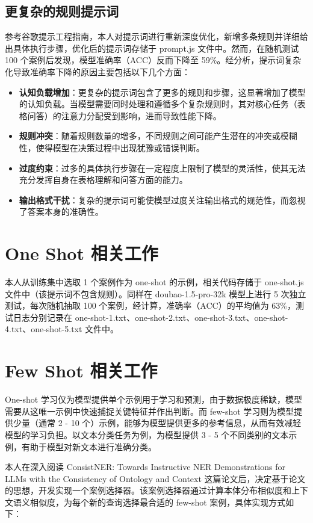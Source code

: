 \subsection{更复杂的规则提示词}
参考谷歌提示工程指南，本人对提示词进行重新深度优化，新增多条规则并详细给出具体执行步骤，优化后的提示词存储于 prompt.js 文件中。然而，在随机测试 100 个案例后发现，模型准确率（ACC）反而下降至 59\%。经分析，提示词复杂化导致准确率下降的原因主要包括以下几个方面：

\begin{itemize}
  \item \textbf{认知负载增加}：更复杂的提示词包含了更多的规则和步骤，这显著增加了模型的认知负载。当模型需要同时处理和遵循多个复杂规则时，其对核心任务（表格问答）的注意力分配受到影响，进而导致性能下降。
  \item \textbf{规则冲突}：随着规则数量的增多，不同规则之间可能产生潜在的冲突或模糊性，使得模型在决策过程中出现犹豫或错误判断。
  \item \textbf{过度约束}：过多的具体执行步骤在一定程度上限制了模型的灵活性，使其无法充分发挥自身在表格理解和问答方面的能力。
  \item \textbf{输出格式干扰}：复杂的提示词可能使模型过度关注输出格式的规范性，而忽视了答案本身的准确性。
\end{itemize}

\section{One Shot 相关工作}
本人从训练集中选取 1 个案例作为 one-shot 的示例，相关代码存储于 one-shot.js 文件中（该提示词不包含规则）。同样在 doubao-1.5-pro-32k 模型上进行 5 次独立测试，每次随机抽取 100 个案例，经计算，准确率（ACC）的平均值为 63\%，测试日志分别记录在 one-shot-1.txt、one-shot-2.txt、one-shot-3.txt、one-shot-4.txt、one-shot-5.txt 文件中。

\section{Few Shot 相关工作}
One-shot 学习仅为模型提供单个示例用于学习和预测，由于数据极度稀缺，模型需要从这唯一示例中快速捕捉关键特征并作出判断。而 few-shot 学习则为模型提供少量（通常 2 - 10 个）示例，能够为模型提供更多的参考信息，从而有效减轻模型的学习负担。以文本分类任务为例，为模型提供 3 - 5 个不同类别的文本示例，有助于模型对新文本进行准确分类。

本人在深入阅读 ConsistNER: Towards Instructive NER Demonstrations for LLMs with the Consistency of Ontology and Context 这篇论文后，决定基于论文的思想，开发实现一个案例选择器。该案例选择器通过计算本体分布相似度和上下文语义相似度，为每个新的查询选择最合适的 few-shot 案例，具体实现方式如下：

